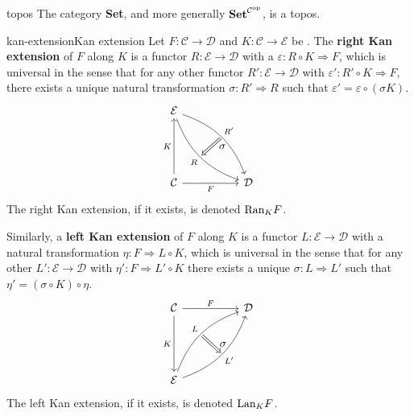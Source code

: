 \begin{example}{topos}
    The category \textbf{Set}, and more generally $\textbf{Set}^{\mathcal{C}^\textup{op}}$, is a topos.
\end{example}

\begin{topic}{kan-extension}{Kan extension}
    Let $F : \mathcal{C} \to \mathcal{D}$ and $K : \mathcal{C} \to \mathcal{E}$ be . The \textbf{right Kan extension} of $F$ along $K$ is a functor $R : \mathcal{E} \to \mathcal{D}$ with a  $\varepsilon : R \circ K \Rightarrow F$, which is universal in the sense that for any other functor $R' : \mathcal{E} \to \mathcal{D}$ with $\varepsilon' : R' \circ K \Rightarrow F$, there exists a unique natural transformation $\sigma : R' \Rightarrow R$ such that $\varepsilon' = \varepsilon \circ (\sigma K)$.
    \[ \begin{tikzcd}[row sep=5em, column sep=5em] \mathcal{E} \arrow[swap, bend right=25]{dr}[name=R1]{R} \arrow[bend left=25]{dr}[name=R2]{R'} \\ \mathcal{C} \arrow[swap]{r}{F} \arrow{u}{K} & \mathcal{D} \arrow[shorten <=2pt,shorten >=2pt,Rightarrow,to path={(R2) -- node[label=right:$\sigma$] {} (R1)}]{}\end{tikzcd} \]
    The right Kan extension, if it exists, is denoted $\textup{Ran}_K F$.

    Similarly, a \textbf{left Kan extension} of $F$ along $K$ is a functor $L : \mathcal{E} \to \mathcal{D}$ with a natural transformation $\eta : F \Rightarrow L \circ K$, which is universal in the sense that for any other $L' : \mathcal{E} \to \mathcal{D}$ with $\eta' : F \Rightarrow L' \circ K$ there exists a unique $\sigma : L \Rightarrow L'$ such that $\eta' = (\sigma \circ K) \circ \eta$.
    \[ \begin{tikzcd}[row sep=5em, column sep=5em] \mathcal{C} \arrow{r}{F} \arrow[swap]{d}{K} & \mathcal{D} \\ \mathcal{E} \arrow[bend left=25]{ur}[name=L1]{L} \arrow[swap, bend right=25]{ur}[name=L2]{L'} \arrow[shorten <=2pt,shorten >=2pt,Rightarrow,to path={(L1) -- node[label=right:$\sigma$] {} (L2)}]{} \end{tikzcd} \]
    The left Kan extension, if it exists, is denoted $\textup{Lan}_K F$.
\end{topic}

